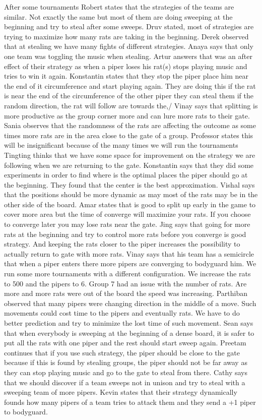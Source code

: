 After some tournaments Robert states that the strategies of the teams are similar. Not exactly the same but most of them are doing sweeping at the beginning and try to steal after some sweeps. 
Druv stated, most of strategies are trying to maximize how many rats are taking in the beginning.
Derek observed that at stealing we have many fights of different strategies.
Anaya says that only one team was toggling the music when stealing.
Artur answers that was an after effect of their strategy as when a piper loses his rat(s) stops playing music and tries to win it again.
Konstantin states that they stop the piper place him near the end of it circumference and start playing again. They are doing this if the rat is near the end of the circumference of the other piper they can steal them if the random direction, the rat will follow are towards the,/
Vinay says that splitting is more productive as the group corner more and can 
lure more rats to their gate.
Sania observes that the randomness of the rats are affecting the outcome as some 
times more rats are in the area close to the gate of a group.
Professor states this will be insignificant because of the many times we will run the tournaments
Tingting thinks that we have some space for improvement on the strategy we are 
following when we are returning to the gate.
Konstantin says that they did some experiments in order to find where is the optimal 
places the piper should go at the beginning. They found that the center is the 
best approximation.
Vishal says that the positions should be more dynamic as may most of the rats may 
be in the other side of the board.
Amar states that is good to split up early in the game to cover more area but the 
time of converge will maximize your rats. If you choose to converge later you may 
lose rats near the gate. 
Jing says that going for more rats at the beginning and try to control more rats 
before you converge is good strategy. And keeping the rats closer to the piper 
increases the possibility to actually return to gate with more rats.
Vinay says that his team has a semicircle that when a piper enters there more 
pipers are converging to bodyguard him.
We run some more tournaments with a different configuration. We increase the rats 
to 500 and the pipers to 6. Group 7 had an issue with the number of rats. Are more 
and more rats were out of the board the speed was increasing. 
Parthiban observed that many pipers were changing direction in the middle of a 
move. Such movements could cost time to the pipers and eventually rats. We have 
to do better prediction and try to minimize the lost time of such movement.
Sean says that when everybody is sweeping at the beginning of a dense board, it 
is safer to put all the rats with one piper and the rest should start sweep again.
Preetam continues that if you use such strategy, the piper should be close to the 
gate because if this is found by stealing groups, the piper should not be far away 
as they can stop playing music and go to the gate to steal from there.
Cathy says that we should discover if a team sweeps not in unison and try to 
steal with a sweeping team of more pipers.
Kevin states that their strategy dynamically founds how many pipers of a team 
tries to attack them and they send a +1 piper to bodyguard.

